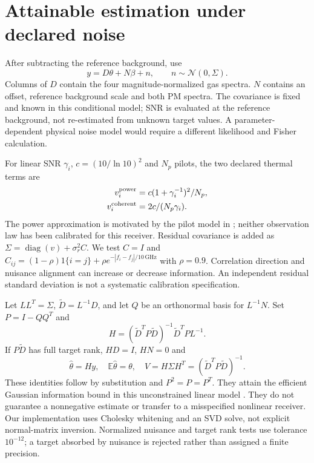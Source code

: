 \documentclass[conference]{IEEEtran}
\begin{document}
\section{Attainable estimation under declared noise}
After subtracting the reference background, use
\begin{equation}
y=D\theta+N\beta+n,\qquad n\sim\mathcal N(0,\Sigma).
\end{equation}
Columns of $D$ contain the four magnitude-normalized gas spectra. $N$ contains an offset, reference background scale and both PM spectra. The covariance is fixed and known in this conditional model; SNR is evaluated at the reference background, not re-estimated from unknown target values. A parameter-dependent physical noise model would require a different likelihood and Fisher calculation.

For linear SNR $\gamma_i$, $c=(10/\ln10)^2$ and $N_p$ pilots, the two declared thermal terms are
\begin{align}
v_i^{\rm power}&=c(1+\gamma_i^{-1})^2/N_p,\\
v_i^{\rm coherent}&=2c/(N_p\gamma_i).
\end{align}
The power approximation is motivated by the pilot model in \cite{dong2026rain}; neither observation law has been calibrated for this receiver. Residual covariance is added as $\Sigma=\operatorname{diag}(v)+\sigma_r^2 C$. We test $C=I$ and $C_{ij}=(1-\rho)1\{i=j\}+\rho e^{-|f_i-f_j|/10\,\mathrm{GHz}}$ with $\rho=0.9$. Correlation direction and nuisance alignment can increase or decrease information. An independent residual standard deviation is not a systematic calibration specification.

Let $L L^T=\Sigma$, $\widetilde D=L^{-1}D$, and let $Q$ be an orthonormal basis for $L^{-1}N$. Set $P=I-QQ^T$ and
\begin{equation}
H=(\widetilde D^TP\widetilde D)^{-1}\widetilde D^TP L^{-1}.
\label{eq:attainable}
\end{equation}
If $P\widetilde D$ has full target rank, $HD=I$, $HN=0$ and
\begin{equation}
\widehat\theta=Hy,\quad \mathbb E\widehat\theta=\theta,\quad
V=H\Sigma H^T=(\widetilde D^TP\widetilde D)^{-1}.
\end{equation}
These identities follow by substitution and $P^2=P=P^T$. They attain the efficient Gaussian information bound in this unconstrained linear model \cite{kay1993}. They do not guarantee a nonnegative estimate or transfer to a misspecified nonlinear receiver. Our implementation uses Cholesky whitening and an SVD solve, not explicit normal-matrix inversion. Normalized nuisance and target rank tests use tolerance $10^{-12}$; a target absorbed by nuisance is rejected rather than assigned a finite precision.
\end{document}
